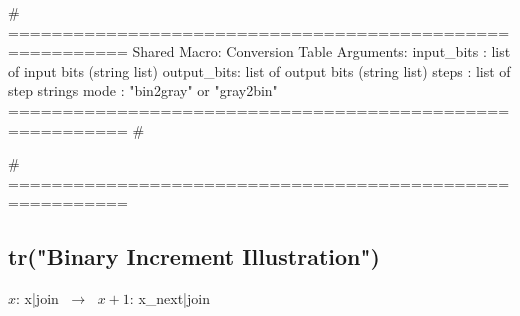 {# =========================================================
   Shared Macro: Conversion Table
   Arguments:
     input_bits : list of input bits (string list)
     output_bits: list of output bits (string list)
     steps      : list of step strings
     mode       : "bin2gray" or "gray2bin"
   ========================================================= #}
{%
\begin{center}
\renewcommand{\arraystretch}{1.3}
\end{center}
{%

{#  =========================================================
{%
\subsection*{ {{tr("Binary Increment Illustration")}} }

$x$: {{ x|join }} $\;\to\;$ $x+1$: {{ x_next|join }}

}}}}
